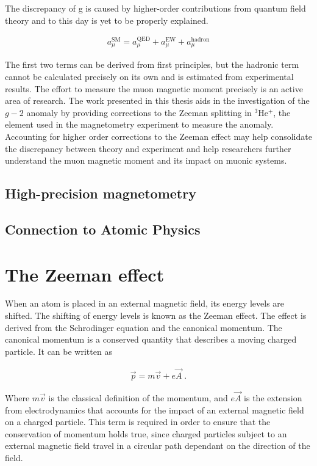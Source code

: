         \noindent The discrepancy of g is caused by higher-order contributions from quantum field theory and to this day is yet to be properly explained. 

        \begin{align}
            a^{\text{SM}}_\mu = a_\mu^{\text{QED}} + a_\mu^{\text{EW}} + a_\mu^{\text{hadron}}
        \end{align}

        \noindent The first two terms can be derived from first principles, but the hadronic term cannot be calculated precisely on its own and is estimated from experimental results. The effort to measure the muon magnetic moment precisely is an active area of research. The work presented in this thesis aids in the investigation of the $g-2$ anomaly by providing corrections to the Zeeman splitting in $^3$He$^+$, the element used in the magnetometry experiment to measure the anomaly. Accounting for higher order corrections to the Zeeman effect may help consolidate the discrepancy between theory and experiment and help researchers further understand the muon magnetic moment and its impact on muonic systems.

        \subsection{High-precision magnetometry}\label{sec:High-Precision-magnetometry}
        \subsection{Connection to Atomic Physics}\label{sec:Connection_To_AMO}

    \section{The Zeeman effect}\label{sec:quadratic_zeeman}
        When an atom is placed in an external magnetic field, its energy levels are shifted. The shifting of energy levels is known as the Zeeman effect. The effect is derived from the Schrodinger equation and the canonical momentum. The canonical momentum is a conserved quantity that describes a moving charged particle. It can be written as 
        
        \begin{align}
            \vec{p} = m\vec{v} + e\vec{A}\;.
        \end{align}

        \noindent Where $m\vec{v}$ is the classical definition of the momentum, and $e\vec{A}$ is the extension from electrodynamics that accounts for the impact of an external magnetic field on a charged particle. This term is required in order to ensure that the conservation of momentum holds true, since charged particles subject to an external magnetic field travel in a circular path dependant on the direction of the field.\\
        
